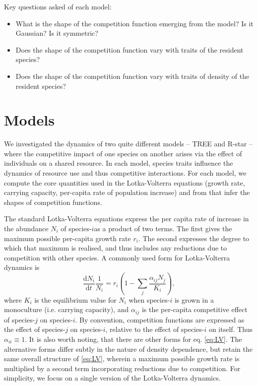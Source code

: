\documentclass[a4paper,11pt]{article}
\newcommand{\ud}{\ensuremath{\mathrm{d}}}
\begin{document}
Key questions asked of each model:

\begin{itemize}
\item What is the shape of the competition function emerging from the
  model? Is it Gaussian? Is it symmetric?
\item Does the shape of the competition function vary with traits of
  the resident species?
\item Does the shape of the competition function vary with traits of
  density of the resident species?
\end{itemize}

\section{Models}


We investigated the dynamics of two quite different models -- TREE and R-star
-- where the competitive impact of one species on another arises via the
effect of individuals on a shared resource. In each model, species traits
influence the dynamics of resource use and thus competitive interactions. For
each model, we compute the core quantities used in the Lotka-Volterra
equations (growth rate, carrying capacity,  per-capita rate of population
increase) and from that infer the shapes of competition functions.

The standard Lotka-Volterra equations express the per capita rate of increase
in the abundance $N_i$ of species-$i$as a product of two terms. The first
gives the maximum possible per-capita growth rate $r_i$. The second expresses
the degree to which that maximum is realised, and thus includes any reductions
due to competition with other species. A commonly used form for Lotka-Volterra dynamics
is
\begin{equation}
\label{eq:LV}
\frac{\ud N_i}{\ud t} \frac{1}{N_i} =  r_i \left(1 - \sum_j
                                      \frac{\alpha_{ij} N_j}{K_i}\right),
\end{equation}
where $K_i$ is the equilibrium value for $N_i$ when species-$i$ is grown in a
monoculture  (i.e. carrying capacity), and $\alpha_{ij}$ is the per-capita
competitive effect of species-$j$ on species-$i$. By convention, competition
functions are expressed as the effect of species-$j$ on species-$i$, relative
to the effect of species-$i$ on itself. Thus $\alpha_{ii}\equiv 1$. It is
also worth noting, that there are other forms for eq. \ref{eq:LV}. The alternative
forms differ subtly in the nature of density dependence, but retain the same
overall structure of \ref{eq:LV}, wherein a maximum possible growth rate is multiplied
by a second term incorporating reductions due to competition. For simplicity,
we focus on a single version of the Lotka-Volterra dynamics.
\end{document}
